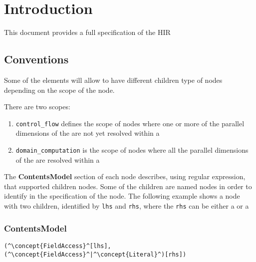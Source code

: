 \section{Introduction}


This document provides a full specification of the HIR

\subsection{Conventions}

Some of the elements will allow to have different children type of nodes depending on the scope of the node.

There are two scopes: 
\begin{enumerate}
	\item {\tt control\_flow} defines the scope of nodes where one or more of the parallel dimensions of the  are not yet resolved within a 
	\item {\tt domain\_computation} is the scope of nodes where all the parallel dimensions of the  are resolved within a 
\end{enumerate}

The {\bf ContentsModel} section of each node describes, using regular expression, that supported children nodes. 
Some of the children are named nodes in order to identify in the specification of the node. The following example shows
a node with two children, identified by {\tt lhs} and {\tt rhs}, where the {\tt rhs} can be either a  or a  

\subsubsection*{ContentsModel}{}

\begin{lstlisting}[style=default]
(^\concept{FieldAccess}^[lhs], (^\concept{FieldAccess}^|^\concept{Literal}^)[rhs])
\end{lstlisting}
